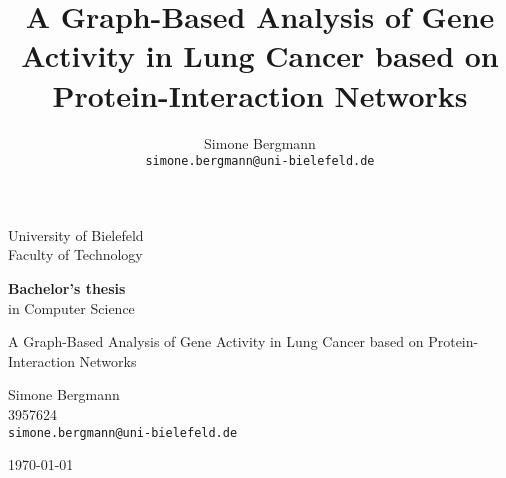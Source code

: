 \documentclass[11pt,a4paper]{article}
\title{A Graph-Based Analysis of Gene Activity in Lung Cancer based on Protein-Interaction Networks}
\author{Simone Bergmann\\
\texttt{simone.bergmann@uni-bielefeld.de}}
\begin{document}
\begin{titlepage}

  \begin{center}
    \Huge{University of Bielefeld} \\

    \vspace{.5cm}
    \Large{Faculty of Technology}

    \vspace{1cm}
    \textbf{Bachelor's thesis}\\
    in Computer Science
    \vspace{2cm}

    \Large{A Graph-Based Analysis of Gene Activity in Lung Cancer based on Protein-Interaction Networks}

    \vspace{2cm}

    Simone Bergmann\\
    3957624\\
    \texttt{simone.bergmann@uni-bielefeld.de}
    \vspace{0.5cm}

    \today
    \vspace{0.5cm}

  \end{center}
\end{titlepage}

\tableofcontents
\newpage






















\newpage

\end{document}
